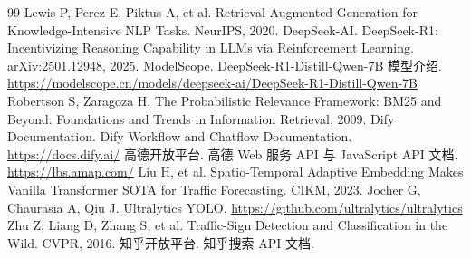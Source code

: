 \documentclass[bwprint]{report}
\begin{document}
\begin{thebibliography}{99}
 Lewis P, Perez E, Piktus A, et al. Retrieval-Augmented Generation for Knowledge-Intensive NLP Tasks. NeurIPS, 2020.
 DeepSeek-AI. DeepSeek-R1: Incentivizing Reasoning Capability in LLMs via Reinforcement Learning. arXiv:2501.12948, 2025.
 ModelScope. DeepSeek-R1-Distill-Qwen-7B 模型介绍. \url{https://modelscope.cn/models/deepseek-ai/DeepSeek-R1-Distill-Qwen-7B}
 Robertson S, Zaragoza H. The Probabilistic Relevance Framework: BM25 and Beyond. Foundations and Trends in Information Retrieval, 2009.
 Dify Documentation. Dify Workflow and Chatflow Documentation. \url{https://docs.dify.ai/}
 高德开放平台. 高德 Web 服务 API 与 JavaScript API 文档. \url{https://lbs.amap.com/}
 Liu H, et al. Spatio-Temporal Adaptive Embedding Makes Vanilla Transformer SOTA for Traffic Forecasting. CIKM, 2023.
 Jocher G, Chaurasia A, Qiu J. Ultralytics YOLO. \url{https://github.com/ultralytics/ultralytics}
 Zhu Z, Liang D, Zhang S, et al. Traffic-Sign Detection and Classification in the Wild. CVPR, 2016.
 知乎开放平台. 知乎搜索 API 文档.
\end{thebibliography}
\end{document}
